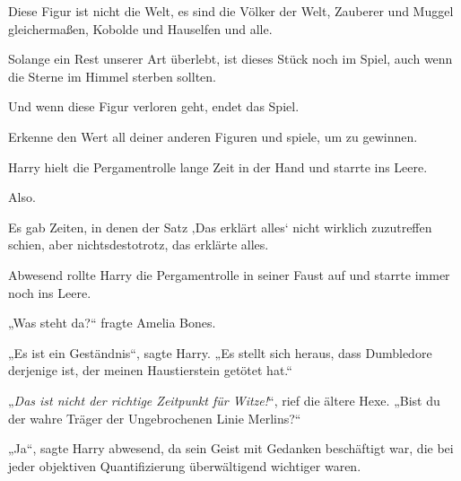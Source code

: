 \begin{writtenNote}
Diese Figur ist nicht die Welt, es sind die Völker der Welt, Zauberer und Muggel gleichermaßen, Kobolde und Hauselfen und alle.

Solange ein Rest unserer Art überlebt, ist dieses Stück noch im Spiel, auch wenn die Sterne im Himmel sterben sollten.

Und wenn diese Figur verloren geht, endet das Spiel.

Erkenne den Wert all deiner anderen Figuren und spiele, um zu gewinnen.

\end{writtenNote}

\later

Harry hielt die Pergamentrolle lange Zeit in der Hand und starrte ins Leere.

Also.

Es gab Zeiten, in denen der Satz ‚Das erklärt alles‘ nicht wirklich zuzutreffen schien, aber nichtsdestotrotz, das erklärte alles.

Abwesend rollte Harry die Pergamentrolle in seiner Faust auf und starrte immer noch ins Leere.

„Was steht da?“ fragte Amelia Bones.

„Es ist ein Geständnis“, sagte Harry.
„Es stellt sich heraus, dass Dumbledore derjenige ist, der meinen Haustierstein getötet hat.“

„\emph{Das ist nicht der richtige Zeitpunkt für Witze!}“, rief die ältere Hexe.
„Bist du der wahre Träger der Ungebrochenen Linie Merlins?“

„Ja“, sagte Harry abwesend, da sein Geist mit Gedanken beschäftigt war, die bei jeder objektiven Quantifizierung überwältigend wichtiger waren.

